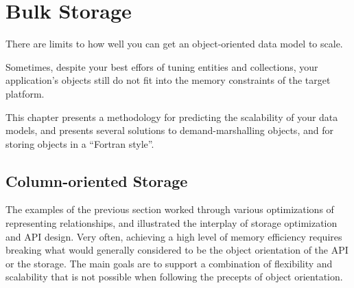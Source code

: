 
\chapter{Bulk Storage}
\label{chapter:large-long-lived}

There are limits to how well you can get an object-oriented data model to scale.

Sometimes, despite your best effors of tuning entities and collections, your
application's objects still do not fit into the memory constraints of the target
platform. 




This chapter presents a methodology for predicting the scalability of your data
models, and presents several solutions to demand-marshalling objects, and for
storing objects in a ``Fortran style''.




\section{Column-oriented Storage}
\label{sec:column-oriented}

The examples of the previous section worked through various optimizations of
representing relationships, and illustrated the interplay of storage optimization
and API design. Very often, achieving a high level of memory efficiency requires
breaking what would generally considered to be the object orientation of the API
or the storage. The main goals are to support a combination of flexibility and
scalability that is not possible when following the precepts of object
orientation.

